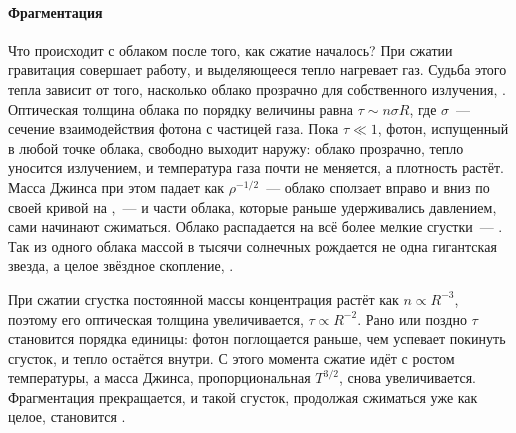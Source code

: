 \paragraph{Фрагментация} Что происходит с облаком после того, как сжатие началось? При сжатии гравитация совершает работу, и выделяющееся тепло нагревает газ. Судьба этого тепла зависит от того, насколько облако прозрачно для собственного излучения, . Оптическая толщина облака по порядку величины равна $\tau \sim n \sigma R$, где $\sigma$~--- сечение взаимодействия фотона с частицей газа. Пока $\tau \ll 1$, фотон, испущенный в любой точке облака, свободно выходит наружу: облако прозрачно, тепло уносится излучением, и температура газа почти не меняется, а плотность растёт. Масса Джинса при этом падает как $\rho^{-1/2}$~--- облако сползает вправо и вниз по своей кривой на ,~--- и части облака, которые раньше удерживались давлением, сами начинают сжиматься. Облако распадается на всё более мелкие сгустки~--- . Так из одного облака массой в тысячи солнечных рождается не одна гигантская звезда, а целое звёздное скопление, .

При сжатии сгустка постоянной массы концентрация растёт как $n \propto R^{-3}$, поэтому его оптическая толщина увеличивается, $\tau \propto R^{-2}$. Рано или поздно $\tau$ становится порядка единицы: фотон поглощается раньше, чем успевает покинуть сгусток, и тепло остаётся внутри. С этого момента сжатие идёт с ростом температуры, а масса Джинса, пропорциональная $T^{3/2}$, снова увеличивается. Фрагментация прекращается, и такой сгусток, продолжая сжиматься уже как целое, становится .
